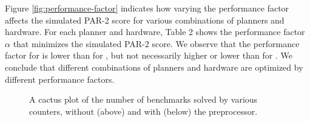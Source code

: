 Figure \ref{fig:performance-factor} indicates how varying the performance factor affects the simulated PAR-2 score for various combinations of planners and hardware. For each planner and hardware, Table 2 shows the performance factor $\alpha$ that minimizes the simulated PAR-2 score. We observe that the performance factor for  is lower than for , but not necessarily higher or lower than for . We conclude that different combinations of planners and hardware are optimized by different performance factors. %


\begin{figure}[tp]
\begin{center}

\vspace*{-0.5cm}
\caption{\label{fig:parallel:comparison} A cactus plot of the number of benchmarks solved by various counters, without (above) and with (below) the   preprocessor.}
\end{center}
\vspace*{-0.8cm}
\end{figure}

